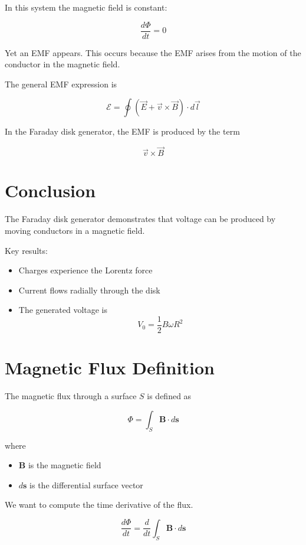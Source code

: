 \documentclass[12pt, a4paper]{article}
\begin{document}
In this system the magnetic field is constant:

\[
\frac{d\Phi}{dt} = 0
\]

Yet an EMF appears. This occurs because the EMF arises from the motion
of the conductor in the magnetic field.

The general EMF expression is

\[
\mathcal{E} = \oint (\vec{E} + \vec{v} \times \vec{B}) \cdot d\vec{l}
\]

In the Faraday disk generator, the EMF is produced by the term

\[
\vec{v} \times \vec{B}
\]

\section{Conclusion}

The Faraday disk generator demonstrates that voltage can be produced
by moving conductors in a magnetic field.

Key results:

\begin{itemize}
\item Charges experience the Lorentz force
\item Current flows radially through the disk
\item The generated voltage is
\[
V_0 = \frac{1}{2} B \omega R^2
\]
\end{itemize}
\section{Magnetic Flux Definition}

The magnetic flux through a surface $S$ is defined as

\begin{equation}
\Phi = \int_S \mathbf{B}\cdot d\mathbf{s}
\end{equation}

where

\begin{itemize}
\item $\mathbf{B}$ is the magnetic field
\item $d\mathbf{s}$ is the differential surface vector
\end{itemize}

We want to compute the time derivative of the flux.

\begin{equation}
\frac{d\Phi}{dt} = \frac{d}{dt}\int_S \mathbf{B}\cdot d\mathbf{s}
\end{equation}
\end{document}
